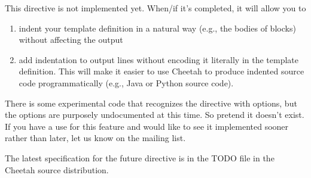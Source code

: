 This directive is not implemented yet.  When/if it's completed, it will allow
you to 
\begin{enumerate}
\item indent your template definition in a natural way (e.g., the bodies
    of  blocks) without affecting the output
\item add indentation to output lines without encoding it literally in the
    template definition.  This will make it easier to use Cheetah to produce
    indented source code programmatically (e.g., Java or Python source code).  
\end{enumerate}

There is some experimental code that recognizes the 
directive with options, but the options are purposely undocumented at this
time.  So pretend it doesn't exist.  If you have a use for this feature
and would like to see it implemented sooner rather than later, let us know
on the mailing list.

The latest specification for the future  directive is in the
TODO file in the Cheetah source distribution.


